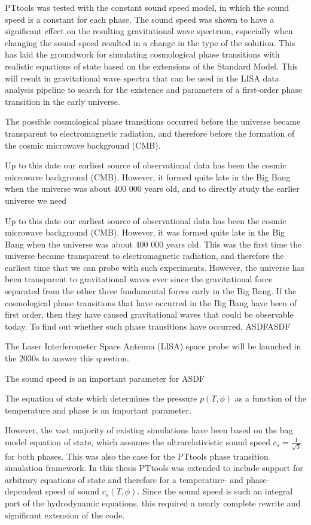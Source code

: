 PTtools was tested with the constant sound speed model, in which the sound speed is a constant for each phase.
The sound speed was shown to have a significant effect on the resulting gravitational wave spectrum,
especially when changing the sound speed resulted in a change in the type of the solution.
This has laid the groundwork for simulating cosmological phase transitions with realistic equations of state based on the extensions of the Standard Model.
This will result in gravitational wave spectra that can be used in the LISA data analysis pipeline to search for the existence and parameters of a first-order phase transition in the early universe.


\iffalse
The possible cosmological phase transitions occurred before the universe became transparent to electromagnetic radiation,
and therefore before the formation of the cosmic microwave background (CMB).

Up to this date our earliest source of observational data has been the cosmic microwave background (CMB).
However, it formed quite late in the Big Bang when the universe was about 400 000 years old,
and to directly study the earlier universe we need

Up to this date our earliest source of observational data has been the cosmic microwave background (CMB).
However, it was formed quite late in the Big Bang when the universe was about 400 000 years old.
This was the first time the universe became transparent to electromagnetic radiation,
and therefore the earliest time that we can probe with such experiments.
However, the universe has been transparent to gravitational waves ever since the gravitational force separated from the other three fundamental forces early in the Big Bang.
If the cosmological phase transitions that have occurred in the Big Bang have been of first order,
then they have caused gravitational waves that could be observable today.
To find out whether such phase transitions have occurred,
ASDFASDF

The Laser Interferometer Space Antenna (LISA) space probe will be launched in the 2030s to answer this question.

The sound speed is an important parameter for ASDF

The equation of state which determines the pressure $p(T,\phi)$ as a function of the temperature and phase is an important parameter.

However, the vast majority of existing simulations have been based on the bag model equation of state, which assumes the ultrarelativistic sound speed $c_s =\frac{1}{\sqrt{3}}$ for both phases.
This was also the case for the PTtools phase transition simulation framework.
In this thesis PTtools was extended  to include support for arbitrary equations of state and therefore for a temperature- and phase-dependent speed of sound $c_s(T,\phi)$.
Since the sound speed is such an integral part of the hydrodynamic equations,
this required a nearly complete rewrite and significant extension of the code.

